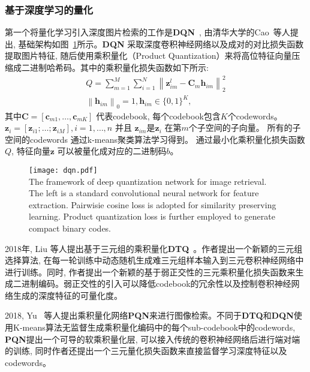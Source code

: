 \subsubsection{基于深度学习的量化}
第一个将量化学习引入深度图片检索的工作是\textbf{DQN}~\cite{yue2016deep}, 由清华大学的Cao~等人提出, 基础架构如图~\ref{fig:dqn}所示。\textbf{DQN} 采取深度卷积神经网络以及成对的对比损失函数提取图片特征, 随后使用乘积量化（Product Quantization）来将高位特征向量压缩成二进制哈希码。其中的乘积量化损失函数如下所示:
\begin{equation}
    \begin{gathered}
        Q=\sum_{m=1}^M \sum_{i=1}^N\left\|\boldsymbol{z}_{i m}^l-\boldsymbol{C}_m \boldsymbol{h}_{i m}\right\|_2^2 \\
        \left\|\boldsymbol{h}_{i m}\right\|_0=1, \boldsymbol{h}_{i m} \in\{0,1\}^K,
        \end{gathered}
    \label{eq:pqloss}
\end{equation}
其中$\mathbf{C}=\left[\mathbf{c}_{m 1}, \ldots, \mathbf{c}_{m K}\right]$ 代表codebook, 每个codebook包含$K$个codewords。 $\mathbf{z}_i=\left[\mathbf{z}_{i 1} ; \ldots ; \mathbf{z}_{i M}\right], i=1, \ldots, n$ 并且 $\mathbf{z}_{im}$是$\mathbf{z}_i$ 在第$m$个子空间的子向量。 所有的子空间的codewords 通过k-means聚类算法学习得到。 通过最小化乘积量化损失函数$Q$, 特征向量$\mathbf{z}$ 可以被量化成对应的二进制码$b$。\par
\begin{figure}[!htp]
    \centering
    \texttt{[image: dqn.pdf]} \\
      {The framework of deep quantization network for image retrieval. The left is a standard convolutional neural network for feature extraction. Pairwisie cosine loss is adopted for similarity preserving learning. Product quantization loss is further employed to generate compact binary codes.}
   \label{fig:dqn}
\end{figure}
2018年, Liu 等人提出基于三元组的乘积量化\textbf{DTQ}~\cite{liu2018deep}。作者提出一个新颖的三元组选择算法, 在每一轮训练中动态随机生成难三元组样本输入到三元卷积神经网络中进行训练。同时, 作者提出一个新颖的基于弱正交性的三元乘积量化损失函数来生成二进制编码。弱正交性的引入可以降低codebook的冗余性以及控制卷积神经网络生成的深度特征的可量化度。\par
2018, Yu ~\cite{yu2018product}等人提出乘积量化网络\textbf{PQN}来进行图像检索。不同于\textbf{DTQ}和\textbf{DQN}使用K-means算法无监督生成乘积量化编码中的每个sub-codebook中的codewords, \textbf{PQN}提出一个可导的软乘积量化层, 可以接入传统的卷积神经网络后进行端对端的训练, 同时作者还提出一个三元量化损失函数来直接监督学习深度特征以及codewords。\par
